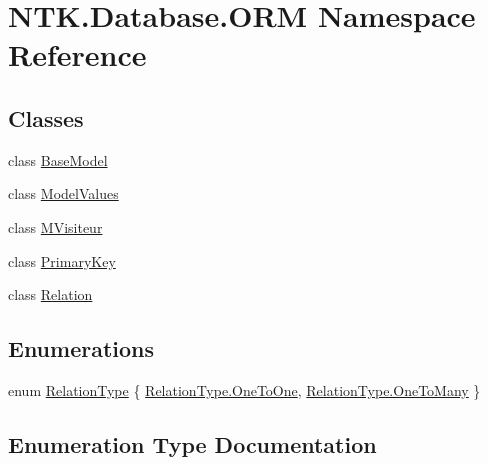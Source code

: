 \hypertarget{namespace_n_t_k_1_1_database_1_1_o_r_m}{}\section{N\+T\+K.\+Database.\+O\+RM Namespace Reference}
\label{namespace_n_t_k_1_1_database_1_1_o_r_m}
\subsection*{Classes}
\begin{DoxyCompactItemize}
\item 
class \mbox{\hyperlink{class_n_t_k_1_1_database_1_1_o_r_m_1_1_base_model}{Base\+Model}}
\item 
class \mbox{\hyperlink{class_n_t_k_1_1_database_1_1_o_r_m_1_1_model_values}{Model\+Values}}
\item 
class \mbox{\hyperlink{class_n_t_k_1_1_database_1_1_o_r_m_1_1_m_visiteur}{M\+Visiteur}}
\item 
class \mbox{\hyperlink{class_n_t_k_1_1_database_1_1_o_r_m_1_1_primary_key}{Primary\+Key}}
\item 
class \mbox{\hyperlink{class_n_t_k_1_1_database_1_1_o_r_m_1_1_relation}{Relation}}
\end{DoxyCompactItemize}
\subsection*{Enumerations}
\begin{DoxyCompactItemize}
\item 
enum \mbox{\hyperlink{namespace_n_t_k_1_1_database_1_1_o_r_m_a97fa169056f48b09978f26a00ef4151b}{Relation\+Type}} \{ \mbox{\hyperlink{namespace_n_t_k_1_1_database_1_1_o_r_m_a97fa169056f48b09978f26a00ef4151ba7dae9a7e25f8b6e3ee6af9a505bd6cee}{Relation\+Type.\+One\+To\+One}}, 
\mbox{\hyperlink{namespace_n_t_k_1_1_database_1_1_o_r_m_a97fa169056f48b09978f26a00ef4151bae4b0a8c44ada3d422e0028984cc5ee78}{Relation\+Type.\+One\+To\+Many}}
 \}
\end{DoxyCompactItemize}


\subsection{Enumeration Type Documentation}
\mbox{\label{namespace_n_t_k_1_1_database_1_1_o_r_m_a97fa169056f48b09978f26a00ef4151b}} 
